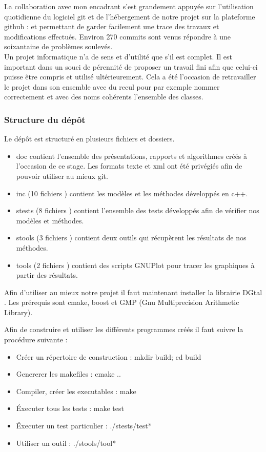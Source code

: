 La collaboration avec mon encadrant s'est grandement appuyée sur l'utilisation quotidienne du logiciel git et de l’hébergement de notre projet sur la plateforme github : \cite{github-tristan} et \cite{github-thomas} permettant de garder facilement une trace des travaux et modifications effectués. Environ 270 commits sont venus répondre à une soixantaine de problèmes soulevés.\\

Un projet informatique n'a de sens et d'utilité que s'il est complet. Il est important dans un souci de pérennité de proposer un travail fini afin que celui-ci puisse être compris et utilisé ultérieurement. Cela a été l’occasion de retravailler le projet dans son ensemble avec du recul pour par exemple nommer correctement et avec des noms cohérents l'ensemble des classes.

\subsubsection{Structure du dépôt}


Le dépôt est structuré en plusieurs fichiers et dossiers.

\begin{itemize}
  \item doc contient l'ensemble des présentations, rapports et algorithmes créés à l'occasion de ce stage. Les formats texte et xml ont été privégiés afin de pouvoir utiliser au mieux git.
  \item inc (10 fichiers ) contient les modèles et les méthodes développés en c++. 
  \item stests (8 fichiers ) contient l'ensemble des tests développés afin de vérifier nos modèles et méthodes.
  \item stools (3 fichiers ) contient deux outils qui récupèrent les résultats de nos méthodes.
  \item tools (2 fichiers ) contient des scripts GNUPlot pour tracer les graphiques à partir des résultats.
\end{itemize}

Afin d'utiliser au mieux notre projet il faut maintenant installer la librairie DGtal \cite{DGtal}. Les prérequis sont cmake, boost et GMP (Gnu Multiprecision Arithmetic Library). 

Afin de construire et utiliser les différents programmes créés il faut suivre la procédure suivante :

\begin{itemize}
  \item Créer un répertoire de construction : mkdir build; cd build
  \item Genererer les makefiles : cmake ..
  \item Compiler, créer les executables : make
  \item Éxecuter tous les tests : make test
  \item Éxecuter un test particulier : ./stests/test*
  \item Utiliser un outil : ./stools/tool*
\end{itemize}

